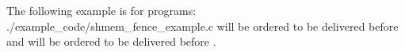 \begin{apidefinition}
\begin{apiexamples}

\apicexample
    {The following  example is for \CorCpp{} programs: }
    {./example_code/shmem_fence_example.c}
    { will be ordered to be delivered before  and 
    will be ordered to be delivered before .}

\end{apiexamples}

\end{apidefinition}
